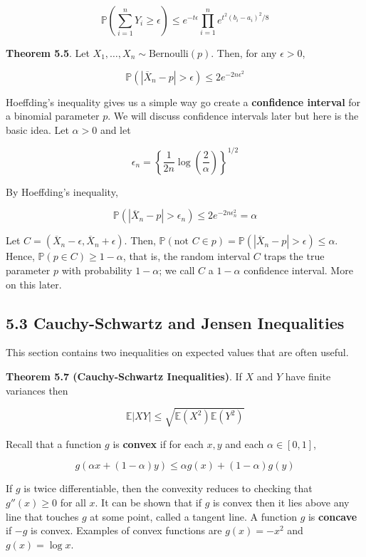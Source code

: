 \[ \mathbb{P}\left( \sum_{i=1}^{n} Y_{i} \geq \epsilon \right) \leq e^{-t\epsilon} \prod_{i=1}^{n} e^{t^{2}(b_{i} - a_{i})^{2} / 8} \]

\textbf{Theorem 5.5}. Let \(X_{1}, \dots, X_{n} \sim \text{Bernoulli}(p)\).
Then, for any \(\epsilon > 0\),

\[ \mathbb{P}(|\overline{X}_{n} - p| > \epsilon) \leq 2e^{-2n\epsilon^{2}} \]

Hoeffding's inequality gives us a simple way go create a
\textbf{confidence interval} for a binomial parameter \(p\). We will
discuss confidence intervals later but here is the basic idea. Let
\(\alpha > 0\) and let

\[ \epsilon_{n} = \left\{ \frac{1}{2n} \log \left( \frac{2}{\alpha} \right) \right\}^{1/2} \]

By Hoeffding's inequality,

\[ \mathbb{P}(|\overline{X}_{n} - p| > \epsilon_{n}) \leq 2e^{-2n\epsilon_{n}^{2}} = \alpha \]

Let \(C = (\overline{X}_{n} - \epsilon, \overline{X}_{n} + \epsilon)\).
Then,
\(\mathbb{P}(\text{not } C \in p) = \mathbb{P}(|\overline{X}_{n} - p| > \epsilon) \leq \alpha\).
Hence, \(\mathbb{P}(p \in C) \geq 1 - \alpha\), that is, the random
interval \(C\) traps the true parameter \(p\) with probability
\(1 - \alpha\); we call \(C\) a \(1 - \alpha\) confidence interval. More
on this later.

\subsection*{5.3 Cauchy-Schwartz and Jensen
Inequalities}\label{cauchy-schwartz-and-jensen-inequalities}

This section contains two inequalities on expected values that are often
useful.

\textbf{Theorem 5.7 (Cauchy-Schwartz Inequalities)}. If \(X\) and \(Y\)
have finite variances then

\[ \mathbb{E}|XY| \leq \sqrt{\mathbb{E}\left(X^{2}\right) \mathbb{E}\left(Y^{2}\right)} \]

Recall that a function \(g\) is \textbf{convex} if for each \(x, y\) and
each \(\alpha \in [0, 1]\),

\[ g(\alpha x + (1 - \alpha)y) \leq \alpha g(x) + (1 - \alpha) g(y) \]

If \(g\) is twice differentiable, then the convexity reduces to checking
that \(g''(x) \geq 0\) for all \(x\). It can be shown that if \(g\) is
convex then it lies above any line that touches \(g\) at some point,
called a tangent line. A function \(g\) is \textbf{concave} if \(-g\) is
convex. Examples of convex functions are \(g(x) = -x^{2}\) and
\(g(x) = \log x\).

